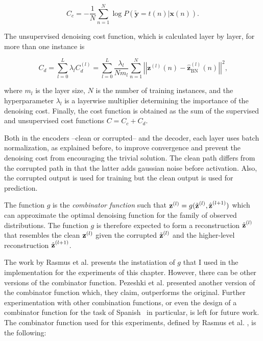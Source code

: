 \[
  C_{c} = -\frac{1}{N} \sum^{N}_{n=1}\log{P(\mathbf{\tilde{y}} = t(n) |
  \mathbf{x}(n))}\text{.}
\]

The unsupervised denoising cost function, which is calculated layer by layer,
for more than one instance is

\[
  C_{d} = \sum^{L}_{l=0} \lambda_{l} C^{(l)}_{d} = \sum^{L}_{l=0}
    \frac{\lambda_{l}}{Nm_{l}} \sum^{N}_{n=1} \left|\left|\mathbf{z}^{(l)}(n) -
    \mathbf{\hat{z}}^{(l)}_{\text{BN}}(n)\right|\right|^{2} \text{,}
\]

where $m_{l}$ is the layer size, $N$ is the number of training instances, and
the hyperparameter $\lambda_{l}$ is a layerwise multiplier determining the
importance of the denoising cost. Finally, the cost function is obtained as the
sum of the supervised and unsupervised cost functions $C = C_{c} + C_{d}$.

Both in the encoders --clean or corrupted-- and the decoder, each layer uses
batch normalization, as explained before, to improve convergence and prevent
the denoising cost from encouraging the trivial solution. The clean path
differs from the corrupted path in that the latter adds gaussian noise before
activation. Also, the corrupted output is used for training but the clean
output is used for prediction.

The function $g$ is the {\em combinator function} such that
$\text{\textbf{z}}^{(l)} = g(\tilde{\text{\textbf{z}}}^{(l)},
\hat{\text{\textbf{z}}}^{(l+1)})$ which can approximate the optimal denoising
function for the family of observed distributions. The function $g$ is
therefore expected to form a reconstruction $\hat{\text{\textbf{z}}}^{(l)}$
that resembles the clean $\text{\textbf{z}}^{(l)}$ given the corrupted
$\tilde{\text{\textbf{z}}}^{(l)}$ and the higher-level reconstruction
$\hat{\text{\textbf{z}}}^{(l+1)}$.

The work by Rasmus et al. \cite{Rasmus:2015aa} presents the instatiation of
$g$ that I used in the implementation for the experiments of this chapter.
However, there can be other versions of the combinator function. Pezeshki et
al. \cite{Pezeshki:2015aa} presented another version of the combinator function
which, they claim, outperforms the original. Further experimentation with other
combination functions, or even the design of a combinator function for the task
of Spanish \vsd~in particular, is left for future work. The combinator function
used for this experiments, defined by Rasmus et al. \cite{Rasmus:2015aa}, is
the following:

